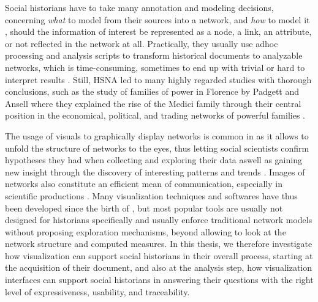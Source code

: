 Social historians have to take many annotation and modeling decisions, concerning \emph{what} to model from their sources into a network, and \emph{how} to model it \cite{cristofoliAuxSourcesGrands2008, dufournaudRechercheEmpiriqueHistoire2015}, \ie should the information of interest be represented as a node, a link, an attribute, or not reflected in the network at all.
Practically, they usually use adhoc processing and analysis scripts to transform historical documents to analyzable networks, which is time-consuming, sometimes to end up with trivial or hard to interpret results \cite{alkadi2022}.
Still, HSNA led to many highly regarded studies with thorough conclusions, such as the study of families of power in Florence by Padgett and Ansell where they explained the rise of the Medici family through their central position in the economical, political, and trading networks of powerful families \cite{padgettRobustActionRise1993}.

The usage of visuals to graphically display networks is common in \sna as it allows to unfold the structure of networks to the eyes, thus letting social scientists confirm hypotheses they had when collecting and exploring their data aswell as gaining new insight through the discovery of interesting patterns and trends \cite{cristofoliPrincipesUsagesDessins}.
Images of networks also constitute an efficient mean of communication, especially in scientific productions \cite{freemanVisualizingSocialNetworks2000}.
Many visualization techniques and softwares have thus been developed since the birth of \sna, but most popular tools are usually not designed for historians specifically and usually enforce traditional network models without proposing exploration mechanisms, beyond allowing to look at the network structure and computed measures.
In this thesis, we therefore investigate how visualization can support social historians in their overall process, starting at the acquisition of their document, and also at the analysis step, \ie  how visualization interfaces can support social historians in answering their questions with the right level of expressiveness, usability, and traceability.






